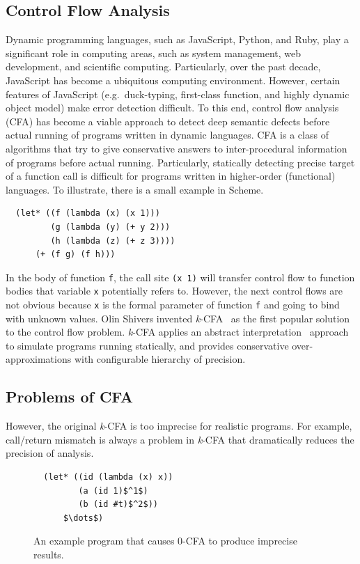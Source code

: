 \documentclass{article}
\begin{document}
\subsection{Control Flow Analysis}
\label{sub:CFA}
Dynamic programming languages, such as JavaScript, Python, and Ruby, play a significant role in computing areas, such as system management, web development, and scientific computing.
Particularly, over the past decade, JavaScript has become a ubiquitous computing environment.
However, certain features of JavaScript (e.g.\ duck-typing, first-class function, and highly dynamic object model) make error detection difficult.
To this end, control flow analysis~\cite{midtgaard2012control}
 (CFA) has become a viable approach to detect deep semantic defects before actual running of programs written in dynamic languages.
CFA is a class of algorithms that try to give conservative answers to inter-procedural information of programs before actual running.
Particularly, statically detecting precise target of a function call is difficult for programs written in higher-order (functional) languages.
To illustrate, there is a small example in Scheme.
\begin{lstlisting}
  (let* ((f (lambda (x) (x 1)))
         (g (lambda (y) (+ y 2)))
         (h (lambda (z) (+ z 3))))
      (+ (f g) (f h)))
\end{lstlisting}
In the body of function \verb|f|, the call site \verb|(x 1)| will transfer control flow to function bodies that variable \verb|x| potentially refers to.
However, the next control flows are not obvious because \verb|x| is the formal parameter of function \verb|f| and going to bind with unknown values.
Olin Shivers invented \textit{k}-CFA~\cite{shivers1991control}
as the first popular solution to the control flow problem.
\textit{k}-CFA applies an abstract interpretation~\cite{cousot1977abstract}
 approach to simulate programs running statically, and provides conservative over-approximations with configurable hierarchy of precision.

\subsection{Problems of CFA}
\label{sub:Problems of CFA}
However, the original \textit{k}-CFA is too imprecise for realistic programs.
For example, call/return mismatch is always a problem in \textit{k}-CFA that dramatically reduces the precision of analysis.

\begin{figure}
\begin{lstlisting}
  (let* ((id (lambda (x) x))
         (a (id 1)$^1$)
         (b (id #t)$^2$))
      $\dots$)
\end{lstlisting}
\caption{An example program that causes 0-CFA to produce imprecise results.}
\label{fig:eg1}
\end{figure}
\end{document}
